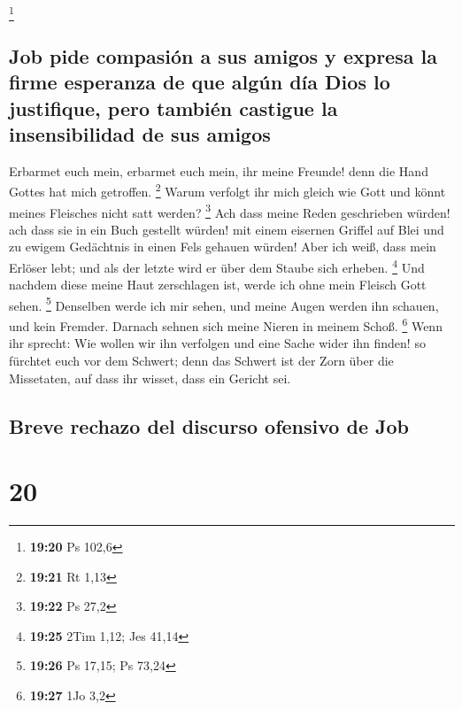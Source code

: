 \footnote{\textbf{19:20} Ps 102,6}

\hypertarget{job-pide-compasiuxf3n-a-sus-amigos-y-expresa-la-firme-esperanza-de-que-alguxfan-duxeda-dios-lo-justifique-pero-tambiuxe9n-castigue-la-insensibilidad-de-sus-amigos}{%
\subsection{Job pide compasión a sus amigos y expresa la firme esperanza
de que algún día Dios lo justifique, pero también castigue la
insensibilidad de sus
amigos}\label{job-pide-compasiuxf3n-a-sus-amigos-y-expresa-la-firme-esperanza-de-que-alguxfan-duxeda-dios-lo-justifique-pero-tambiuxe9n-castigue-la-insensibilidad-de-sus-amigos}}

 Erbarmet euch mein, erbarmet euch mein, ihr meine
Freunde! denn die Hand Gottes hat mich getroffen. \footnote{\textbf{19:21}
  Rt 1,13}  Warum verfolgt ihr mich gleich wie Gott und
könnt meines Fleisches nicht satt werden? \footnote{\textbf{19:22} Ps
  27,2}  Ach dass meine Reden geschrieben würden! ach
dass sie in ein Buch gestellt würden!  mit einem eisernen
Griffel auf Blei und zu ewigem Gedächtnis in einen Fels gehauen würden!
 Aber ich weiß, dass mein Erlöser lebt; und als der
letzte wird er über dem Staube sich erheben. \footnote{\textbf{19:25}
  2Tim 1,12; Jes 41,14}  Und nachdem diese meine Haut
zerschlagen ist, werde ich ohne mein Fleisch Gott sehen. \footnote{\textbf{19:26}
  Ps 17,15; Ps 73,24}  Denselben werde ich mir sehen, und
meine Augen werden ihn schauen, und kein Fremder. Darnach sehnen sich
meine Nieren in meinem Schoß. \footnote{\textbf{19:27} 1Jo 3,2}
 Wenn ihr sprecht: Wie wollen wir ihn verfolgen und eine
Sache wider ihn finden!  so fürchtet euch vor dem
Schwert; denn das Schwert ist der Zorn über die Missetaten, auf dass ihr
wisset, dass ein Gericht sei.

\hypertarget{breve-rechazo-del-discurso-ofensivo-de-job}{%
\subsection{Breve rechazo del discurso ofensivo de
Job}\label{breve-rechazo-del-discurso-ofensivo-de-job}}

\hypertarget{section-19}{%
\section{20}\label{section-19}}

